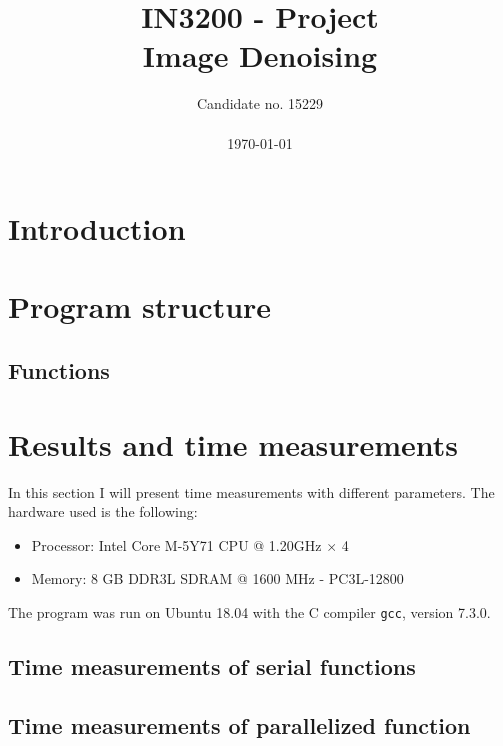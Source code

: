 \documentclass[10pt, a4paper]{amsart}
\title[Image Denoising]{IN3200 - Project \\ \large
Image Denoising}
\author[Candidate no. 15229]{Candidate no. 15229 \\ \\ \today}
\numberwithin{figure}{section}
\numberwithin{table}{section}
\begin{document}
\maketitle


\tableofcontents

\section{Introduction}


\section{Program structure}

\subsection{Functions}

\section{Results and time measurements}
In this section I will present time measurements with different parameters. The hardware used is the following:
\begin{itemize}
  \item Processor: Intel Core M-5Y71 CPU @ 1.20GHz $\times$ 4
  \item Memory: 8 GB DDR3L SDRAM @ 1600 MHz - PC3L-12800
\end{itemize}
The program was run on Ubuntu 18.04 with the C compiler \texttt{gcc}, version 7.3.0.

\subsection{Time measurements of serial functions}

\subsection{Time measurements of parallelized function}






\end{document}

